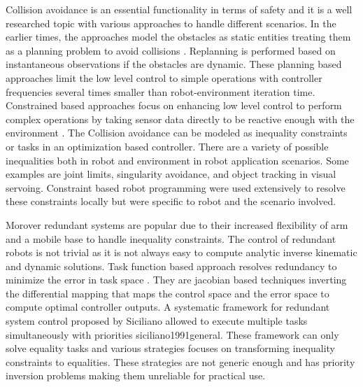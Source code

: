 
Collision avoidance is an essential functionality in terms of safety and it is a well researched topic with various approaches  to handle different scenarios. In the earlier times, the approaches model the obstacles as static entities treating them as a planning problem to avoid collisions \cite{van2011reciprocal}. Replanning is performed based on instantaneous observations if the obstacles are dynamic. These planning based approaches limit the low level control to simple operations with controller frequencies  several times smaller than robot-environment iteration time. Constrained based approaches focus on enhancing low level control to perform complex operations by taking sensor data directly to be reactive enough with the environment \cite{khatib1986real}. The Collision avoidance can be modeled as inequality constraints or tasks in an optimization based controller. There are a variety of possible inequalities both in robot and environment in robot application scenarios. Some examples are joint limits, singularity avoidance, and object tracking in visual servoing. Constraint based robot programming were used extensively to resolve these constraints  locally but were specific to robot and the scenario involved.

Morover  redundant systems are popular due to their increased ﬂexibility of arm and a mobile base to handle inequality constraints. The control of redundant robots is not trivial as it is not always easy to compute  analytic inverse kinematic and dynamic solutions. Task function based approach  resolves redundancy to minimize the error in task space \cite{Samson1991}. They are jacobian based techniques inverting the differential mapping that maps the control space and the error space to compute optimal controller outputs. A systematic framework for redundant system control proposed by Siciliano allowed to execute multiple tasks simultaneously with priorities {siciliano1991general}. These framework can only solve equality tasks and various strategies focuses on transforming inequality constraints to equalities\cite{Nelson95strategiesfor,chan1995weighted,mansard2009directional,raunhardt2007progressive}. These strategies are not generic enough and has priority inversion problems making them unreliable for practical use. 

